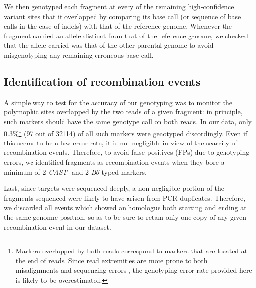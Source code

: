 We then genotyped each fragment at every of the remaining high-confidence variant sites that it overlapped by comparing its base call (or sequence of base calls in the case of indels) with that of the reference genome.
Whenever the fragment carried an allele distinct from that of the reference genome, we checked that the allele carried was that of the other parental genome to avoid misgenotyping any remaining erroneous base call.



\subsection{Identification of recombination events}

A simple way to test for the accuracy of our genotyping was to monitor the polymophic sites overlapped by the two reads of a given fragment: in principle, such markers should have the same genotype call on both reads.
In our data, only 0.3\%\footnote{Markers overlapped by both reads correspond to markers that are located at the end of reads. Since read extremities are more prone to both misalignments and sequencing errors \citep{kircher2009improved,minoche2011evaluation,abnizova2012analysis,wang2012estimation,laehnemann2016denoising}, the genotyping error rate provided here is likely to be overestimated.} (97 out of 32114) of all such markers were genotyped discordingly. 
Even if this seems to be a low error rate, it is not negligible in view of the scarcity of recombination events.
Therefore, to avoid false positives (FPs) due to genotyping errors, we identified fragments as recombination events when they bore a minimum of 2 \textit{CAST}- and 2 \textit{B6}-typed markers.

Last, since targets were sequenced deeply, a non-negligible portion of the fragments sequenced were likely to have arisen from PCR duplicates. 
Therefore, we discarded all events which showed an homologue both starting and ending at the same genomic position, so as to be sure to retain only one copy of any given recombination event in our dataset.\\

